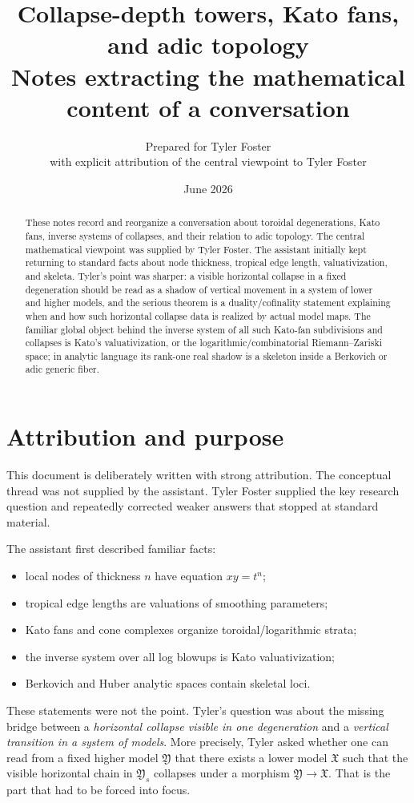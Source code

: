 \documentclass[11pt]{article}
\title{Collapse-depth towers, Kato fans, and adic topology\\
\large Notes extracting the mathematical content of a conversation}
\author{Prepared for Tyler Foster\\
\small with explicit attribution of the central viewpoint to Tyler Foster}
\date{June 2026}
\newcommand{\mfX}{\mathfrak X}
\newcommand{\mfY}{\mathfrak Y}
\begin{document}
\maketitle

\begin{abstract}
These notes record and reorganize a conversation about toroidal degenerations, Kato fans, inverse systems of collapses, and their relation to adic topology. The central mathematical viewpoint was supplied by Tyler Foster. The assistant initially kept returning to standard facts about node thickness, tropical edge length, valuativization, and skeleta. Tyler's point was sharper: a visible horizontal collapse in a fixed degeneration should be read as a shadow of vertical movement in a system of lower and higher models, and the serious theorem is a duality/cofinality statement explaining when and how such horizontal collapse data is realized by actual model maps. The familiar global object behind the inverse system of all such Kato-fan subdivisions and collapses is Kato's valuativization, or the logarithmic/combinatorial Riemann--Zariski space; in analytic language its rank-one real shadow is a skeleton inside a Berkovich or adic generic fiber.
\end{abstract}

\tableofcontents

\section{Attribution and purpose}

This document is deliberately written with strong attribution. The conceptual thread was not supplied by the assistant. Tyler Foster supplied the key research question and repeatedly corrected weaker answers that stopped at standard material.

The assistant first described familiar facts:
\begin{itemize}[leftmargin=2em]
\item local nodes of thickness $n$ have equation $xy=t^n$;
\item tropical edge lengths are valuations of smoothing parameters;
\item Kato fans and cone complexes organize toroidal/logarithmic strata;
\item the inverse system over all log blowups is Kato valuativization;
\item Berkovich and Huber analytic spaces contain skeletal loci.
\end{itemize}
These statements were not the point. Tyler's question was about the missing bridge between a \emph{horizontal collapse visible in one degeneration} and a \emph{vertical transition in a system of models}. More precisely, Tyler asked whether one can read from a fixed higher model $\mfY$ that there exists a lower model $\mfX$ such that the visible horizontal chain in $\mfY_s$ collapses under a morphism $\mfY\to\mfX$. That is the part that had to be forced into focus.
\end{document}
